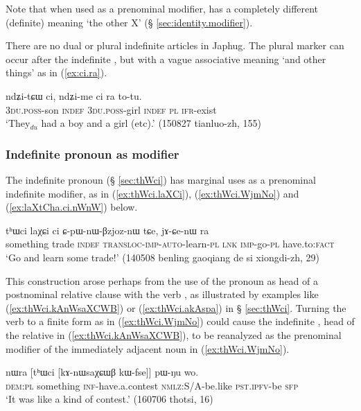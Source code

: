 Note that when used as a prenominal modifier,  has a completely different (definite) meaning `the other X' (§ \ref{sec:identity.modifier}). 

There are no dual or plural indefinite articles in Japhug. The plural marker  can occur after the indefinite , but with a vague associative meaning `and other things' as in (\ref{ex:ci.ra}).

\begin{exe}
\ex \label{ex:ci.ra}
 \gll  ndʑi-tɕɯ ci, ndʑi-me ci ra to-tu. \\
 \textsc{3du}.\textsc{poss}-son \textsc{indef}  \textsc{3du}.\textsc{poss}-girl \textsc{indef} \textsc{pl} \textsc{ifr}-exist \\
 \glt  `They$_{du}$ had a boy and a girl (etc).' (150827 tianluo-zh, 155)
\end{exe}

\subsubsection{Indefinite pronoun as modifier} \label{sec:indefinite}
The indefinite pronoun  (§ \ref{sec:thWci}) has marginal uses as a prenominal indefinite modifier, as in  (\ref{ex:thWci.laXCi}), (\ref{ex:thWci.WjmNo}) and (\ref{ex:laXtCha.ci.nWnW}) below. 

\begin{exe}
\ex \label{ex:thWci.laXCi}
\gll   tʰɯci laχɕi ci ɕ-pɯ-nɯ-βzjoz-nɯ tɕe, jɤ-ɕe-nɯ ra \\
something trade \textsc{indef} \textsc{transloc-imp-auto}-learn-\textsc{pl} \textsc{lnk} \textsc{imp}-go-\textsc{pl} have.to:\textsc{fact} \\
\glt `Go and learn some trade!' (140508 benling gaoqiang de si xiongdi-zh, 29)
 \end{exe}
 
 This construction arose perhaps from the use of the pronoun  as head of a postnominal relative clause with the verb , as illustrated by examples like (\ref{ex:thWci.kAnWsaXCWB}) or (\ref{ex:thWci.akAspa}) in § \ref{sec:thWci}. Turning the verb  to a finite form as in (\ref{ex:thWci.WjmNo}) could cause the indefinite , head of the relative in (\ref{ex:thWci.kAnWsaXCWB}), to be reanalyzed as the prenominal modifier of the immediately adjacent noun in (\ref{ex:thWci.WjmNo}).

 \begin{exe}
\ex \label{ex:thWci.kAnWsaXCWB}
\gll nɯra [tʰɯci [kɤ-nɯsaχɕɯβ kɯ-fse]] pɯ-ŋu wo.  \\
\textsc{dem}:\textsc{pl} something \textsc{inf}-have.a.contest \textsc{nmlz}:S/A-be.like \textsc{pst}.\textsc{ipfv}-be \textsc{sfp} \\
\glt `It was like a kind of contest.' (160706 thotsi, 16)
 \end{exe}
 
